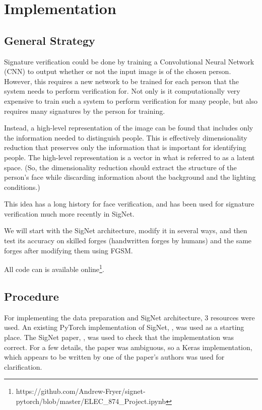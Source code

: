\section{Implementation}\label{sec:implementation}


\subsection{General Strategy}

Signature verification could be done by training a Convolutional Neural Network (CNN) to output whether or not the input image is of the chosen person.
However, this requires a new network to be trained for each person that the system needs to perform verification for.
Not only is it computationally very expensive to train such a system to perform verification for many people, but also requires many signatures by the person for training.

Instead, a high-level representation of the image can be found that includes only the information needed to distinguish people.
This is effectively dimensionality reduction that preserves only the information that is important for identifying people.
The high-level representation is a vector in what is referred to as a latent space.
(So, the dimensionality reduction should extract the structure of the person's face while discarding information about the background and the lighting conditions.)

This idea has a long history for face verification\cite{LeCun}, and has been used for signature verification much more recently in SigNet\cite{sig_net}.

We will start with the SigNet architecture, modify it in several ways, and then test its accuracy on skilled forges (handwritten forges by humans) and the same forges after modifying them using FGSM.

All code can is available online\footnote{https://github.com/Andrew-Fryer/signet-pytorch/blob/master/ELEC\_874\_Project.ipynb}.


\subsection{Procedure}

For implementing the data preparation and SigNet architecture, 3 resources were used.
An existing PyTorch implementation of SigNet, \cite{GitHub_signet_pytorch}, was used as a starting place.
The SigNet paper, \cite{sig_net}, was used to check that the implementation was correct.
For a few details, the paper was ambiguous, so a Keras implementation, \cite{GitHub_sounakdey} which appears to be written by one of the paper's authors was used for clarification.

